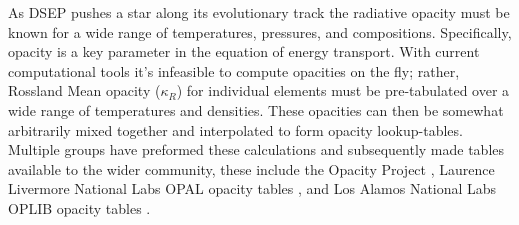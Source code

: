 As DSEP pushes a star along its evolutionary track the radiative opacity must
be known for a wide range of temperatures, pressures, and compositions.
Specifically, opacity is a key parameter in the equation of energy transport.
With current computational tools it's infeasible to compute opacities on the
fly; rather, Rossland Mean opacity ($\kappa_{R}$) for individual elements must
be pre-tabulated over a wide range of temperatures and densities. These
opacities can then be somewhat arbitrarily mixed together and interpolated to
form opacity lookup-tables. Multiple groups have preformed these calculations
and subsequently made tables available to the wider community, these include
the Opacity Project \citep[OP][]{Seaton1994}, Laurence Livermore National Labs
OPAL opacity tables \citep{Iglesias1996}, and Los Alamos National Labs OPLIB
opacity tables \citep{Colgan2016}.
